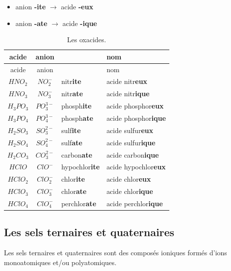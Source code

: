 \documentclass[
  11pt,
  a4paper,
  openany]{book}
\providecommand{\tightlist}{%
  \setlength{\itemsep}{0pt}\setlength{\parskip}{0pt}}
\begin{document}
\begin{itemize}
\tightlist
\item
  anion \textbf{-ite} \(\longrightarrow\) acide \textbf{-eux}
\item
  anion \textbf{-ate} \(\longrightarrow\) acide \textbf{-ique}
\end{itemize}

\newpage

\begin{longtable}[]{@{}ccll@{}}
\caption{\label{tab:oxacides} Les oxacides.}\tabularnewline
\toprule\noalign{}
acide & anion & & nom \\
\midrule\noalign{}
\endfirsthead
\toprule\noalign{}
acide & anion & & nom \\
\midrule\noalign{}
\endhead
\bottomrule\noalign{}
\endlastfoot
\(HNO_2\) & \(NO_2^{-}\) & nitr\textbf{ite} & acide nitr\textbf{eux} \\
\(HNO_3\) & \(NO_3^{-}\) & nitr\textbf{ate} & acide nitr\textbf{ique} \\
\(H_3PO_3\) & \(PO_3^{3-}\) & phosph\textbf{ite} & acide phosphor\textbf{eux} \\
\(H_3PO_4\) & \(PO_4^{3-}\) & phosph\textbf{ate} & acide phosphor\textbf{ique} \\
\(H_2SO_3\) & \(SO_3^{2-}\) & sulf\textbf{ite} & acide sulfur\textbf{eux} \\
\(H_2SO_4\) & \(SO_4^{2-}\) & sulf\textbf{ate} & acide sulfur\textbf{ique} \\
\(H_2CO_3\) & \(CO_3^{2-}\) & carbon\textbf{ate} & acide carbon\textbf{ique} \\
\(HClO\) & \(ClO^{-}\) & hypochlor\textbf{ite} & acide hypochlor\textbf{eux} \\
\(HClO_2\) & \(ClO_2^{-}\) & chlor\textbf{ite} & acide chlor\textbf{eux} \\
\(HClO_3\) & \(ClO_3^{-}\) & chlor\textbf{ate} & acide chlor\textbf{ique} \\
\(HClO_4\) & \(ClO_4^{-}\) & perchlor\textbf{ate} & acide perchlor\textbf{ique} \\
\end{longtable}

\subsection{Les sels ternaires et quaternaires}\label{les-sels-ternaires-et-quaternaires}

Les sels ternaires et quaternaires sont des composés ioniques formés d'ions monoatomiques et/ou polyatomiques.
\end{document}
